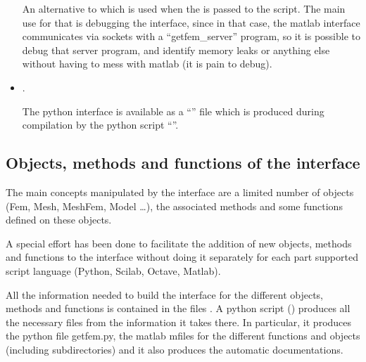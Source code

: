 \documentclass[a4paper,11pt,english]{sphinxmanual}
\begin{document}
\begin{itemize}
An alternative to  which is used when the
 is passed to the  script. The main use
for that is debugging the interface, since in that case, the matlab interface
communicates via sockets with a “getfem\_server” program, so it is possible to
debug that server program, and identify memory leaks or anything else without
having to mess with matlab (it is pain to debug).

\item {} 
.

The python interface is available as a “” file which is
produced during compilation by the python script
“”.

\end{itemize}


\subsection{Objects, methods and functions of the interface}
\label{\detokenize{project/libdesc_interface:objects-methods-and-functions-of-the-interface}}
The main concepts manipulated by the interface are a limited number of objects
(Fem, Mesh, MeshFem, Model …), the associated methods and some functions defined on these objects.

A special effort has been done to facilitate the addition of new objects, methods and functions to the interface without doing it separately for each part supported script language (Python, Scilab, Octave, Matlab).

All the information needed to build the interface for the different objects, methods and functions is contained in the files . A python script () produces all the necessary files from the information it takes there. In particular, it produces the python file getfem.py, the matlab m\sphinxhyphen{}files for the different functions and objects (including subdirectories) and it also produces the automatic documentations.
\end{document}
